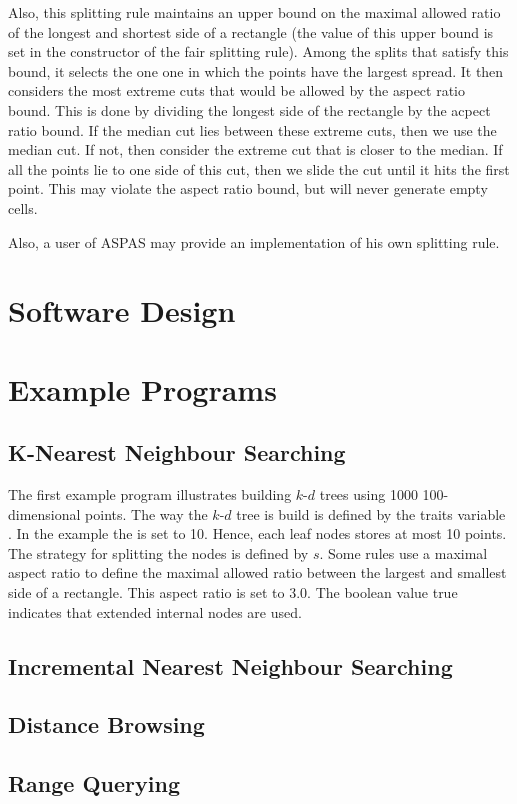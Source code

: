 \begin{itemize}
Also, this splitting rule maintains an upper
bound on the maximal allowed ratio of the longest and shortest side of
a rectangle (the value of this upper bound is set in the constructor of the
fair splitting rule). Among the splits that satisfy this bound, it selects
the one one in which the points have the largest spread.
It then considers the most extreme cuts that would be allowed by the
aspect ratio bound. This is done by dividing the longest side of
the rectangle by the acpect ratio bound. If the median cut lies
between these extreme cuts, then we use the median cut. If not,
then consider the extreme cut that is closer to the median.
If all the points lie to one side of this cut, then we slide the cut
until it hits the first point.
This may violate the aspect ratio bound, but will never generate empty cells.

\end{itemize}

Also, a user of ASPAS may provide an implementation of his own
splitting rule.

\section{Software Design}

\section{Example Programs}

\subsection{K-Nearest Neighbour Searching}

The first example program illustrates building $k$-$d$ trees using 1000
100-dimensional points.
The way the $k$-$d$ tree is build is defined by the traits variable .
In the example the  is set to 10.
Hence, each leaf nodes stores at most 10 points.
The strategy for splitting the nodes is defined by $s$.
Some rules use a maximal aspect ratio to define
the maximal allowed ratio between the largest and smallest side of a rectangle.
This aspect ratio is set to 3.0. The boolean value true indicates that
extended internal nodes are used.


\subsection{Incremental Nearest Neighbour Searching}

\subsection{Distance Browsing}

\subsection{Range Querying}
